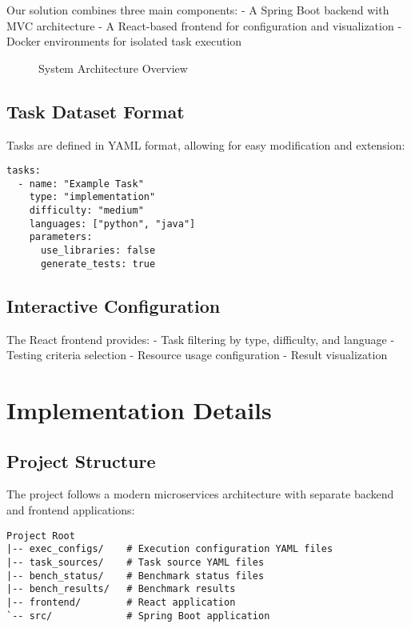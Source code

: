 Our solution combines three main components:
- A Spring Boot backend with MVC architecture
- A React-based frontend for configuration and visualization
- Docker environments for isolated task execution

\begin{figure}[h]
    \centering
    \caption{System Architecture Overview}
    \label{fig:architecture}
\end{figure}

\section{Task Dataset Format}

Tasks are defined in YAML format, allowing for easy modification and extension:

\begin{verbatim}
tasks:
  - name: "Example Task"
    type: "implementation"
    difficulty: "medium"
    languages: ["python", "java"]
    parameters:
      use_libraries: false
      generate_tests: true
\end{verbatim}

\section{Interactive Configuration}

The React frontend provides:
- Task filtering by type, difficulty, and language
- Testing criteria selection
- Resource usage configuration
- Result visualization

\chapter{Implementation Details}

\section{Project Structure}

The project follows a modern microservices architecture with separate backend and frontend applications:

\begin{verbatim}
Project Root
|-- exec_configs/    # Execution configuration YAML files
|-- task_sources/    # Task source YAML files
|-- bench_status/    # Benchmark status files
|-- bench_results/   # Benchmark results
|-- frontend/        # React application
`-- src/             # Spring Boot application
\end{verbatim}

